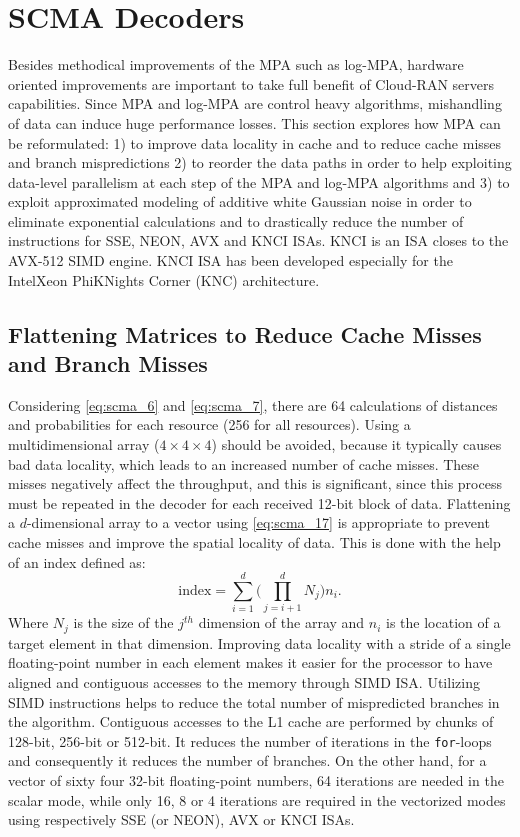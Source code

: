 \section{SCMA Decoders}
\label{sec:opt_scma}

Besides methodical improvements of the MPA such as log-MPA, hardware oriented
improvements are important to take full benefit of Cloud-RAN servers
capabilities. Since MPA and log-MPA are control heavy algorithms, mishandling of
data can induce huge performance losses. This section explores how MPA can be
reformulated: 1) to improve data locality in cache and to reduce cache misses
and branch mispredictions 2) to reorder the data paths in order to help
exploiting data-level parallelism at each step of the MPA and log-MPA algorithms
and 3) to exploit approximated modeling of additive white Gaussian noise in
order to eliminate exponential calculations and to drastically reduce the number
of instructions for SSE, NEON, AVX and KNCI ISAs. KNCI is an ISA closes to the
AVX-512 SIMD engine. KNCI ISA has been developed especially for the Intel\R Xeon
Phi\TM KNights Corner (KNC) architecture.

\subsection{Flattening Matrices to Reduce Cache Misses and Branch Misses}
\label{sec:opt_scma_flattening}

Considering \eqref{eq:scma_6} and \eqref{eq:scma_7}, there are 64 calculations
of distances and probabilities for each resource (256 for all resources). Using
a multidimensional array ($4\times4\times4$) should be avoided, because it
typically causes bad data locality, which leads to an increased number of cache
misses. These misses negatively affect the throughput, and this is significant,
since this process must be repeated in the decoder for each received 12-bit
block of data. Flattening a $d$-dimensional array to a vector using
\eqref{eq:scma_17} is appropriate to prevent cache misses and improve the
spatial locality of data. This is done with the help of an index defined as:
\begin{equation}
  \label{eq:scma_17}
  \text{index} = \sum\limits_{i=1}^d\Bigg( \prod\limits_{j=i+1}^d N_j \Bigg)n_i.
\end{equation}
Where $N_j$ is the size of the $j^{th}$ dimension of the array and $n_i$ is the
location of a target element in that dimension. Improving data locality with
a stride of a single floating-point number in each element makes it easier for
the processor to have aligned and contiguous accesses to the memory through SIMD
ISA. Utilizing SIMD instructions helps to reduce the total number of
mispredicted branches in the algorithm. Contiguous accesses to the L1 cache are
performed by chunks of 128-bit, 256-bit or 512-bit. It reduces the number of
iterations in the \verb|for|-loops and consequently it reduces the number of
branches. On the other hand, for a vector of sixty four 32-bit floating-point
numbers, 64 iterations are needed in the scalar mode, while only 16, 8 or 4
iterations are required in the vectorized modes using respectively SSE (or
NEON), AVX or KNCI ISAs.

